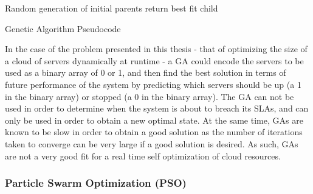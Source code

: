 \begin{algorithm}
Random generation of initial parents
return best fit child
\caption{Genetic Algorithm Pseudocode}\label{algo:ga}
\end{algorithm}

In the case of the problem presented in this thesis - that of optimizing the size of a cloud of servers dynamically at runtime - a GA could encode the servers to be used as a binary array of 0 or 1, and then find the best solution in terms of future performance of the system by predicting which servers should be up (a 1 in the binary array) or stopped (a 0 in the binary array). The GA can not be used in order to determine when the system is about to breach its SLAs, and can only be used in order to obtain a new optimal state. At the same time, GAs are known to be slow in order to obtain a good solution as the number of iterations taken to converge can be very large if a good solution is desired. As such, GAs are not a very good fit for a real time self optimization of cloud resources.

\subsubsection{Particle Swarm Optimization (PSO)}

